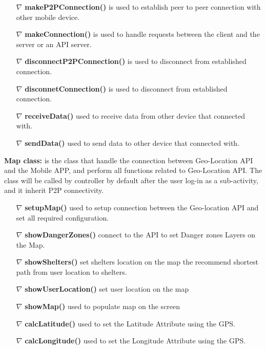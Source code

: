 \documentclass{scrreprt}
\begin{document}
\begin{itemize}


\item[$\nabla$] \textbf{makeP2PConnection()} is used to establish peer to peer connection with other mobile device.
\item[$\nabla$] \textbf{makeConnection()} is used to handle  requests between the client and the server or an API server.
\item[$\nabla$] \textbf{disconnectP2PConnection()} is used to disconnect from established connection.
\item[$\nabla$] \textbf{disconnetConnection()} is used to disconnect from established connection.
\item[$\nabla$] \textbf{receiveData()} used to receive data from other device that connected with.
\item[$\nabla$] \textbf{sendData()} used to send data to other device that  connected with.
\end{itemize}
\clearpage


\textbf{Map class:} is the class that handle the connection between Geo-Location API and the Mobile APP, and perform all functions related to Geo-Location API.
The class will be called by controller by default after the user log-in as a sub-activity, and it inherit P2P connectivity.

\begin{itemize}
\item[$\nabla$] \textbf{setupMap()} used to setup connection between the Geo-location API and set all required configuration.
\item[$\nabla$] \textbf{showDangerZones()} connect to the API to set Danger zones Layers on the Map. 
\item[$\nabla$] \textbf{showShelters()} set shelters location on the map the recommend shortest path from user location to shelters.
\item[$\nabla$] \textbf{showUserLocation()} set user location on the map
\item[$\nabla$] \textbf{showMap()} used to populate map on the screen
\item[$\nabla$] \textbf{calcLatitude()} used to  set the Latitude Attribute using the GPS.
\item[$\nabla$] \textbf{calcLongitude()} used to  set the Longitude Attribute using the GPS.
\end{itemize}
\end{document}
